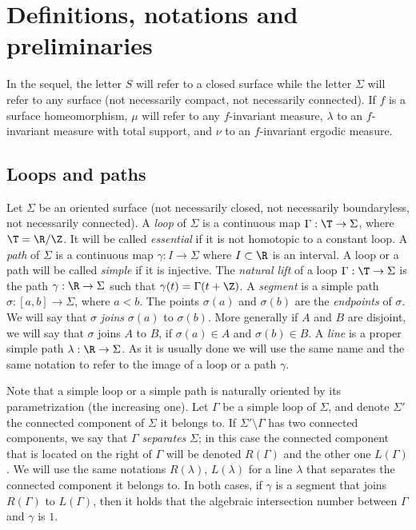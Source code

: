 \setcounter{section}{1}
\section{Definitions, notations and preliminaries}\label{s:preliminaries}



In the sequel, the letter $S$ will refer to a closed surface while the letter $\Sigma$ will refer to any surface (not necessarily compact, not necessarily connected). If $f$ is a surface homeomorphism, $\mu$ will refer to any $f$-invariant measure, $\lambda$ to an $f$-invariant measure with total support, and $\nu$ to an $f$-invariant ergodic measure.



\subsection{Loops and paths}\label{ss:loopsandpaths}



Let $\Sigma$ be an oriented surface (not necessarily closed, not necessarily boundaryless, not necessarily connected). A \emph{loop} of $\Sigma$ is a continuous map $\Gamma: \T\to \Sigma$, where $\T=\R/\Z$. It will be called \emph{essential} if it is not homotopic to a constant loop. A \emph{path} of $\Sigma$ is a continuous map $\gamma: I\to \Sigma$ where $I\subset \R$ is an interval. A loop or a path will be called \emph{simple} if it is injective. The \emph{natural lift} of a loop $\Gamma: \T\to \Sigma$ is the path $\gamma:\R\to \Sigma$ such that $\gamma(t)=\Gamma(t+\Z)$. A \emph{segment} is a simple path $\sigma:[a,b]\to \Sigma$, where $a<b$. The points $\sigma(a)$ and $\sigma(b)$ are the \emph{endpoints} of $\sigma$. We will say that $\sigma$ \emph{joins} $\sigma(a)$ to $\sigma(b)$. More generally if $A$ and $B$ are disjoint, we will say that $\sigma$ joins $A$ to $B$, if $\sigma(a)\in A$ and $\sigma(b)\in B$. A \emph{line} is a proper simple path $\lambda:\R\to \Sigma$. As it is usually done we will use the same name and the same notation to refer to the image of a loop or a path $\gamma$.

Note that a simple loop or a simple path is naturally oriented by its parametrization (the increasing one). Let $\Gamma$ be a simple loop of $\Sigma$, and denote $\Sigma'$ the connected component of $\Sigma$ it belongs to. If $\Sigma'\setminus\Gamma$ has two connected components, we say that $\Gamma$ \emph{separates} $\Sigma$; in this case the connected component that is located on the right of $\Gamma$ will be denoted $R(\Gamma)$ and the other one $L(\Gamma)$. We will use the same notations $R(\lambda)$, $L(\lambda)$ for a line $\lambda$ that separates the connected component it belongs to. In both cases, if $\gamma$ is a segment that joins $R(\Gamma)$ to $L(\Gamma)$, then it holds that the algebraic intersection number between $\Gamma$ and $\gamma$ is $1$.



